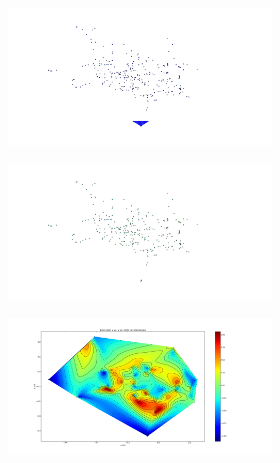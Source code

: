 \begin{figure}
  \centering
  \begin{subfigure}{0.48\textwidth}
    \begin{subfigure}{\textwidth}
      \includegraphics[clip, trim = 20 0 150 0, width=\textwidth]{figures/chapter3/contour_x}
    \end{subfigure}
    \begin{subfigure}{\textwidth}
      \includegraphics[clip, trim = 20 0 150 0, width=\textwidth]{figures/chapter3/contour_y}
    \end{subfigure}
    \begin{subfigure}{\textwidth}
      \includegraphics[clip, trim = 20 0 150 0, width=\textwidth]{figures/chapter3/contour_z}

\end{subfigure}
\end{subfigure}
\end{figure}
